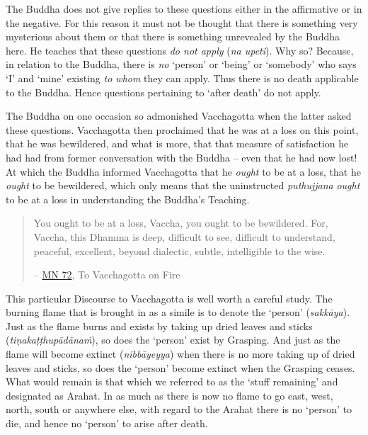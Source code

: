 The Buddha does not give replies to these questions either in the affirmative or in the negative. For this reason it must not be thought that there is something very mysterious about them or that there is something unrevealed by the Buddha here. He teaches that these questions \emph{do not apply} (\textit{na upeti}). Why so? Because, in relation to the Buddha, there is \emph{no} `person' or `being' or `somebody' who says `I' and `mine' existing \emph{to whom} they can apply. Thus there is no death applicable to the Buddha. Hence questions pertaining to `after death' do not apply.

The Buddha on one occasion so admonished Vacchagotta when the latter asked these questions. Vacchagotta then proclaimed that he was at a loss on this point, that he was bewildered, and what is more, that that measure of satisfaction he had had from former conversation with the Buddha -- even that he had now lost! At which the Buddha informed Vacchagotta that he \emph{ought} to be at a loss, that he \emph{ought} to be bewildered, which only means that the uninstructed \textit{puthujjana} \emph{ought} to be at a loss in understanding the Buddha's Teaching.

\begin{quote}
You ought to be at a loss, Vaccha, you ought to be bewildered. For, Vaccha, this Dhamma is deep, difficult to see, difficult to understand, peaceful, excellent, beyond dialectic, subtle, intelligible to the wise.

 -- \href{https://suttacentral.net/mn72/en/thanissaro}{MN 72}, To Vacchagotta on Fire
\end{quote}

This particular Discourse to Vacchagotta is well worth a careful study. The burning flame that is brought in as a simile is to denote the `person' (\textit{sakkāya}). Just as the flame burns and exists by taking up dried leaves and sticks (\textit{tiṇakaṭṭhupādānaṁ}), so does the `person' exist by Grasping. And just as the flame will become extinct (\textit{nibbāyeyya}) when there is no more taking up of dried leaves and sticks, so does the `person' become extinct when the Grasping ceases. What would remain is that which we referred to as the `stuff remaining' and designated as Arahat. In as much as there is now no flame to go east, west, north, south or anywhere else, with regard to the Arahat there is no `person' to die, and hence no `person' to arise after death.

